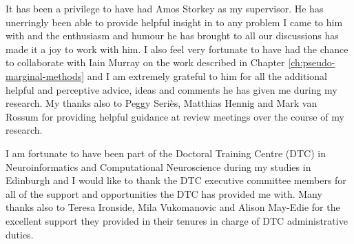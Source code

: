 
\enlargethispage{2\baselineskip}



It has been a privilege to have had Amos Storkey as my supervisor. He has unerringly been able to provide helpful insight in to any problem I came to him with and the enthusiasm and humour he has brought to all our discussions has made it a joy to work with him. I also feel very fortunate to have had the chance to collaborate with Iain Murray on the work described in Chapter \ref{ch:pseudo-marginal-methods} and I am extremely grateful to him for all the additional helpful and perceptive advice, ideas and comments he has given me during my research. My thanks also to Peggy Seri\`{e}s, Matthias Hennig and Mark van Rossum for providing helpful guidance at review meetings over the course of my research.





I am fortunate to have been part of the Doctoral Training Centre (DTC) in Neuroinformatics and Computational Neuroscience during my studies in Edinburgh and I would like to thank the DTC executive committee members for all of the support and opportunities the DTC has provided me with. Many thanks also to Teresa Ironside, Mila Vukomanovic and Alison May-Edie for the excellent support they provided in their tenures in charge of DTC administrative duties.

